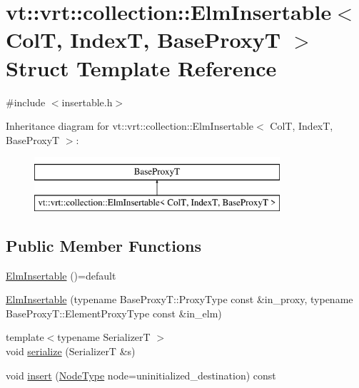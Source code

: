 \hypertarget{structvt_1_1vrt_1_1collection_1_1_elm_insertable}{}\section{vt\+:\+:vrt\+:\+:collection\+:\+:Elm\+Insertable$<$ ColT, IndexT, Base\+ProxyT $>$ Struct Template Reference}
\label{structvt_1_1vrt_1_1collection_1_1_elm_insertable}


{\ttfamily \#include $<$insertable.\+h$>$}

Inheritance diagram for vt\+:\+:vrt\+:\+:collection\+:\+:Elm\+Insertable$<$ ColT, IndexT, Base\+ProxyT $>$\+:\begin{figure}[H]
\begin{center}
\leavevmode
\includegraphics[height=2.000000cm]{structvt_1_1vrt_1_1collection_1_1_elm_insertable}
\end{center}
\end{figure}
\subsection*{Public Member Functions}
\begin{DoxyCompactItemize}
\item 
\hyperlink{structvt_1_1vrt_1_1collection_1_1_elm_insertable_a0a5528f369218ac386c4ab521bebffdd}{Elm\+Insertable} ()=default
\item 
\hyperlink{structvt_1_1vrt_1_1collection_1_1_elm_insertable_adbe57f67f3d9648a9ec8434ecdde0bd6}{Elm\+Insertable} (typename Base\+Proxy\+T\+::\+Proxy\+Type const \&in\+\_\+proxy, typename Base\+Proxy\+T\+::\+Element\+Proxy\+Type const \&in\+\_\+elm)
\item 
{\footnotesize template$<$typename SerializerT $>$ }\\void \hyperlink{structvt_1_1vrt_1_1collection_1_1_elm_insertable_a5d4a505bd59521679dd69cf835c67f85}{serialize} (SerializerT \&s)
\item 
void \hyperlink{structvt_1_1vrt_1_1collection_1_1_elm_insertable_a64d4e9f56250258d2f72f57cebcf1349}{insert} (\hyperlink{namespacevt_a866da9d0efc19c0a1ce79e9e492f47e2}{Node\+Type} node=uninitialized\+\_\+destination) const
\end{DoxyCompactItemize}


